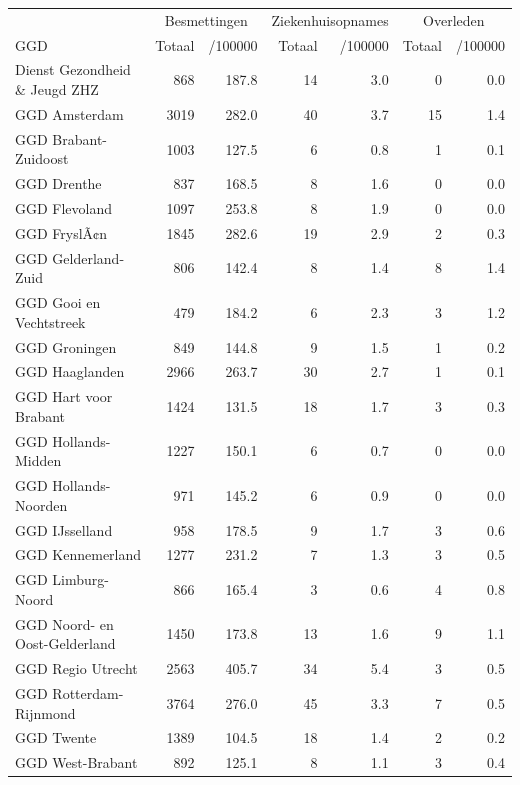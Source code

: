 \documentclass[
  english,
  man,floatsintext]{apa6}
\begin{document}
\begin{table}
\centering\begingroup\fontsize{10}{12}\selectfont

\begin{threeparttable}
\begin{tabular}{lrrrrrr}
\toprule
\multicolumn{1}{c}{ } & \multicolumn{2}{c}{Besmettingen} & \multicolumn{2}{c}{Ziekenhuisopnames} & \multicolumn{2}{c}{Overleden} \\
\cmidrule(l{3pt}r{3pt}){2-3} \cmidrule(l{3pt}r{3pt}){4-5} \cmidrule(l{3pt}r{3pt}){6-7}
GGD & Totaal & /100000 & Totaal & /100000 & Totaal & /100000\\
\midrule
Dienst Gezondheid \& Jeugd ZHZ & 868 & 187.8 & 14 & 3.0 & 0 & 0.0\\
GGD Amsterdam & 3019 & 282.0 & 40 & 3.7 & 15 & 1.4\\
GGD Brabant-Zuidoost & 1003 & 127.5 & 6 & 0.8 & 1 & 0.1\\
GGD Drenthe & 837 & 168.5 & 8 & 1.6 & 0 & 0.0\\
GGD Flevoland & 1097 & 253.8 & 8 & 1.9 & 0 & 0.0\\
GGD FryslÃ¢n & 1845 & 282.6 & 19 & 2.9 & 2 & 0.3\\
GGD Gelderland-Zuid & 806 & 142.4 & 8 & 1.4 & 8 & 1.4\\
GGD Gooi en Vechtstreek & 479 & 184.2 & 6 & 2.3 & 3 & 1.2\\
GGD Groningen & 849 & 144.8 & 9 & 1.5 & 1 & 0.2\\
GGD Haaglanden & 2966 & 263.7 & 30 & 2.7 & 1 & 0.1\\
GGD Hart voor Brabant & 1424 & 131.5 & 18 & 1.7 & 3 & 0.3\\
GGD Hollands-Midden & 1227 & 150.1 & 6 & 0.7 & 0 & 0.0\\
GGD Hollands-Noorden & 971 & 145.2 & 6 & 0.9 & 0 & 0.0\\
GGD IJsselland & 958 & 178.5 & 9 & 1.7 & 3 & 0.6\\
GGD Kennemerland & 1277 & 231.2 & 7 & 1.3 & 3 & 0.5\\
GGD Limburg-Noord & 866 & 165.4 & 3 & 0.6 & 4 & 0.8\\
GGD Noord- en Oost-Gelderland & 1450 & 173.8 & 13 & 1.6 & 9 & 1.1\\
GGD Regio Utrecht & 2563 & 405.7 & 34 & 5.4 & 3 & 0.5\\
GGD Rotterdam-Rijnmond & 3764 & 276.0 & 45 & 3.3 & 7 & 0.5\\
GGD Twente & 1389 & 104.5 & 18 & 1.4 & 2 & 0.2\\
GGD West-Brabant & 892 & 125.1 & 8 & 1.1 & 3 & 0.4\\

\end{tabular}
\end{threeparttable}
\end{table}
\end{document}
